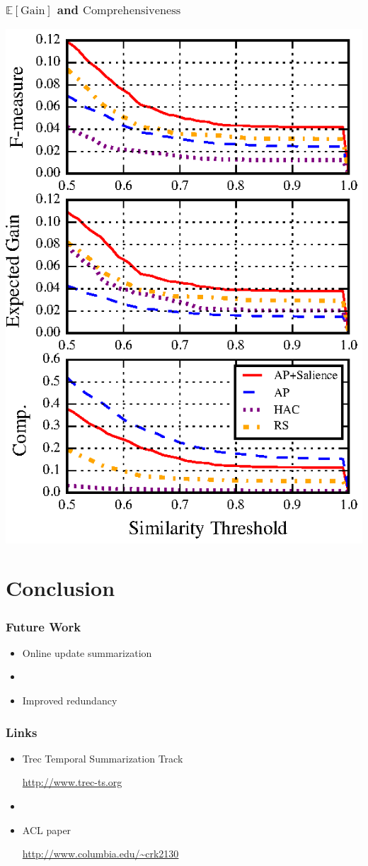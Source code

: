 \documentclass{beamer}
\begin{document}
\begin{frame}
\frametitle{$\mathbb{E}[\mathrm{Gain}]$ and $\mathrm{Comprehensiveness}$}
\begin{center}
\includegraphics[scale=.7]{images/nuggets-metrics2.eps}
\end{center}
\end{frame}

\section{Conclusion}
\begin{frame}
\frametitle{Future Work}

\begin{itemize}
\item Online update summarization
\pause
\item[]
\item Improved redundancy
\end{itemize}
\end{frame}

\begin{frame}
\frametitle{Links}

\begin{itemize}
\item Trec Temporal Summarization Track \\ 
    \begin{center}\url{http://www.trec-ts.org}\end{center}
\item[]
\item ACL paper\\\begin{center} \url{http://www.columbia.edu/~crk2130}\end{center}
\end{itemize}

\end{frame}
\end{document}
